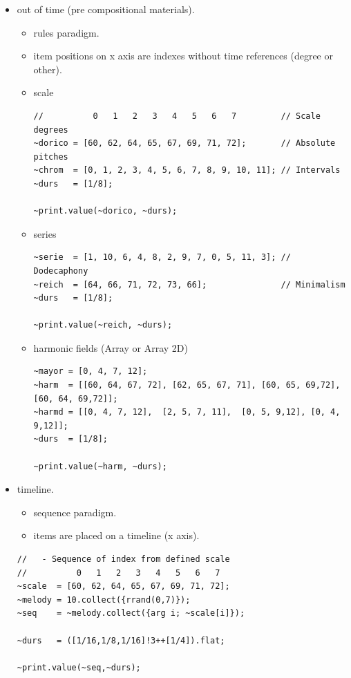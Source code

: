\begin{itemize}
\tightlist
\item out of time (pre compositional materials).
  \begin{itemize}
  \tightlist
  \item rules paradigm.
  \item item positions on x axis are indexes without time references (degree or other).
  \item scale
\begin{lstlisting}[frame=single] 
//          0   1   2   3   4   5   6   7         // Scale degrees
~dorico = [60, 62, 64, 65, 67, 69, 71, 72];       // Absolute pitches
~chrom  = [0, 1, 2, 3, 4, 5, 6, 7, 8, 9, 10, 11]; // Intervals
~durs   = [1/8];

~print.value(~dorico, ~durs);
\end{lstlisting}

  \item series
\begin{lstlisting}[frame=single] 
~serie  = [1, 10, 6, 4, 8, 2, 9, 7, 0, 5, 11, 3]; // Dodecaphony
~reich  = [64, 66, 71, 72, 73, 66];               // Minimalism
~durs   = [1/8];

~print.value(~reich, ~durs);
\end{lstlisting}

  \item harmonic fields (Array or Array 2D)
\begin{lstlisting}[frame=single]
~mayor = [0, 4, 7, 12];
~harm  = [[60, 64, 67, 72], [62, 65, 67, 71], [60, 65, 69,72], [60, 64, 69,72]];
~harmd = [[0, 4, 7, 12],  [2, 5, 7, 11],  [0, 5, 9,12], [0, 4, 9,12]];
~durs  = [1/8];

~print.value(~harm, ~durs);
\end{lstlisting}
  \end{itemize}
  
\item timeline.

  \begin{itemize}
  \tightlist
  \item sequence paradigm.
  \item items are placed on a timeline (x axis).
  \end{itemize}

\begin{lstlisting}[frame=single] 
//   - Sequence of index from defined scale
//          0   1   2   3   4   5   6   7
~scale  = [60, 62, 64, 65, 67, 69, 71, 72];      
~melody = 10.collect({rrand(0,7)});
~seq    = ~melody.collect({arg i; ~scale[i]});
                
~durs   = ([1/16,1/8,1/16]!3++[1/4]).flat; 

~print.value(~seq,~durs); 
\end{lstlisting}
\end{itemize}

